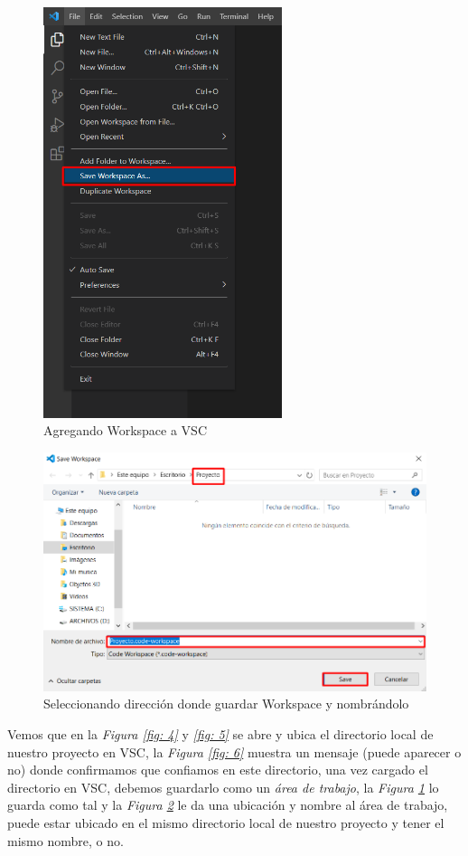 \begin{figure}[H]
    \centering
    \caption{Agregando Workspace a VSC}
    \label{fig: 7}
    \includegraphics[height=12cm]{capturas/creando_w4.png}
\end{figure}
\begin{figure}[H]
    \centering
    \caption{Seleccionando dirección donde guardar Workspace y nombrándolo}
    \label{fig: 8}
    \includegraphics[width=12cm]{capturas/creando_w5.png}
\end{figure}

Vemos que en la \textit{Figura \ref{fig: 4}} y \textit{\ref{fig: 5}} se abre y ubica el directorio local de nuestro proyecto en VSC, la \textit{Figura \ref{fig: 6}} muestra un mensaje (puede aparecer o no) donde confirmamos que confiamos en este directorio, una vez cargado el directorio en VSC, debemos guardarlo como un \textit{área de trabajo}, la \textit{Figura \ref{fig: 7}} lo guarda como tal y la \textit{Figura \ref{fig: 8}} le da una ubicación y nombre al área de trabajo, puede estar ubicado en el mismo directorio local de nuestro proyecto y tener el mismo nombre, o no.

